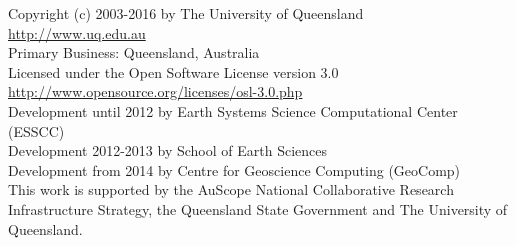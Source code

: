 
%
%
%

\begin{center}
Copyright (c) 2003-2016 by The University of Queensland\\
\url{http://www.uq.edu.au}\\
Primary Business: Queensland, Australia\\
Licensed under the Open Software License version 3.0\\
\url{http://www.opensource.org/licenses/osl-3.0.php}\\
Development until 2012 by Earth Systems Science Computational Center (ESSCC)\\
Development 2012-2013 by School of Earth Sciences\\
Development from 2014 by Centre for Geoscience Computing (GeoComp)\\

This work is supported by the AuScope National Collaborative Research
Infrastructure Strategy, the Queensland State Government and The University
of Queensland.
\end{center}

